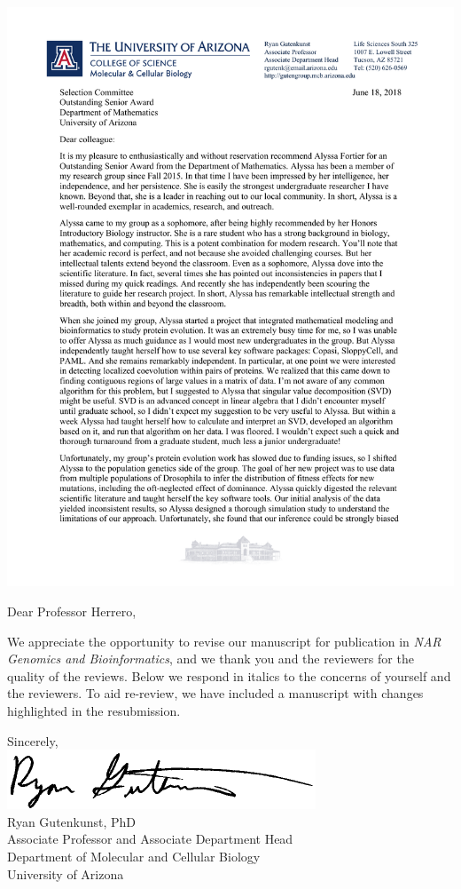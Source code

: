 \documentclass[11pt]{article}
\begin{document}
\vspace*{-0.5in}\hspace*{-0.2in}\includegraphics{LetterheadHeader}\vspace*{\baselineskip}

\noindent Dear Professor Herrero,

We appreciate the opportunity to revise our manuscript for publication in \emph{NAR Genomics and Bioinformatics}, and we thank you and the reviewers for the quality of the reviews. Below we respond in italics to the concerns of yourself and the reviewers. To aid re-review, we have included a manuscript with changes highlighted in the resubmission.

\noindent Sincerely,\\
\includegraphics{signature}\\
Ryan Gutenkunst, PhD\\
Associate Professor and Associate Department Head\\
Department of Molecular and Cellular Biology\\
University of Arizona
\end{document}
